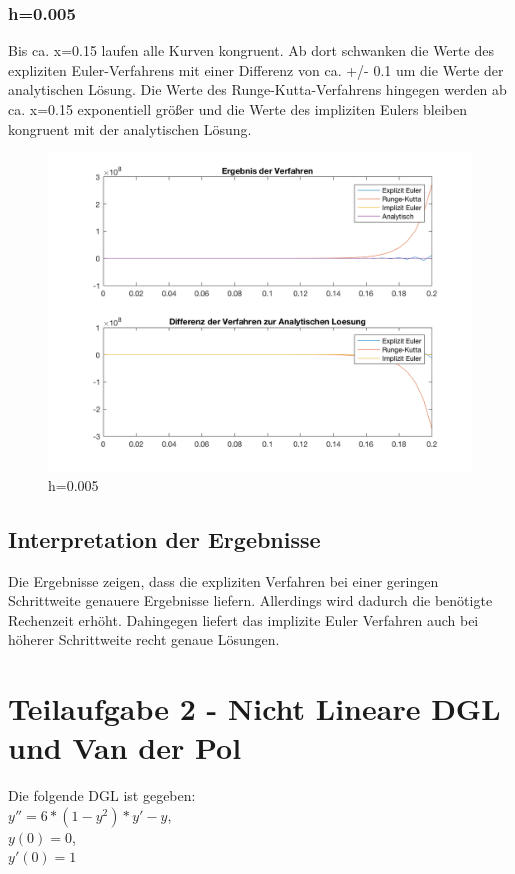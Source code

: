 \documentclass[]{scrartcl}
\begin{document}
\subsubsection{h=0.005}
Bis ca. x=0.15 laufen alle Kurven kongruent. Ab dort schwanken die Werte des expliziten Euler-Verfahrens mit einer Differenz von ca. +/- 0.1 um die Werte der analytischen Lösung. Die Werte des Runge-Kutta-Verfahrens hingegen werden ab ca. x=0.15 exponentiell größer und die Werte des impliziten Eulers bleiben kongruent mit der analytischen Lösung.
\begin{figure}[H]
	\centering
	\includegraphics[width=1\linewidth]{a1_1_4}
	\caption{h=0.005}
	\label{fig:a1_1_4}
\end{figure}

\subsection{Interpretation der Ergebnisse}
Die Ergebnisse zeigen, dass die expliziten Verfahren bei einer geringen Schrittweite genauere Ergebnisse liefern. Allerdings wird dadurch die benötigte Rechenzeit erhöht. Dahingegen liefert das implizite Euler Verfahren auch bei höherer Schrittweite recht genaue Lösungen.

\section{Teilaufgabe 2 - Nicht Lineare DGL und Van der Pol}
Die folgende DGL ist gegeben: \\
$ y'' = 6 * (1 - y^{2}) * y' - y $, \\
$ y(0) = 0 $, \\
$ y'(0) = 1 $ \\
\end{document}

